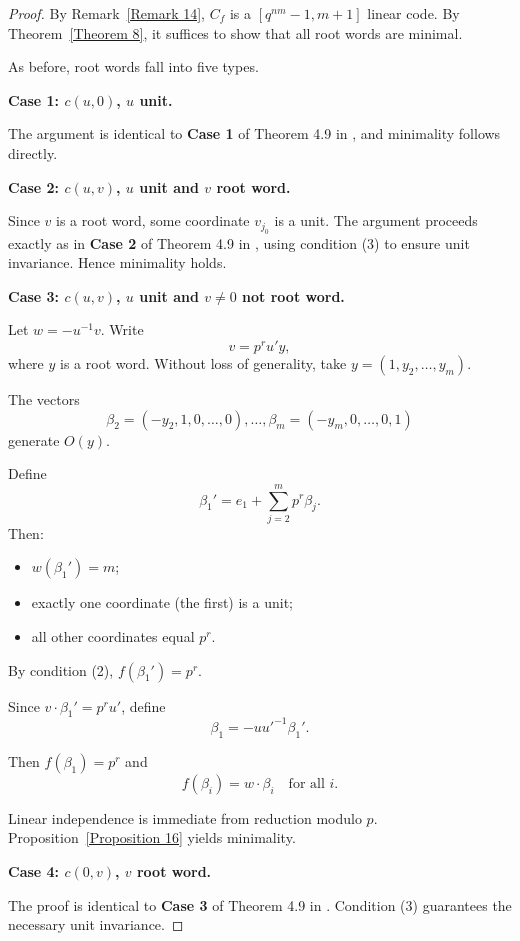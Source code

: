 \documentclass[10pt]{article}
\theoremstyle{definition}
\begin{document}
\begin{proof}

By Remark~\ref{Remark 14},
$C_f$ is a $[q^{nm}-1,m+1]$ linear code.
By Theorem~\ref{Theorem 8},
it suffices to show that all root words are minimal.

As before, root words fall into five types.

\medskip
\noindent
\textbf{Case 1: $c(u,0)$, $u$ unit.}

The argument is identical to
{\bf Case 1} of Theorem 4.9 in \cite{WuLuCao},
and minimality follows directly.

\medskip
\noindent
\textbf{Case 2: $c(u,v)$, $u$ unit and $v$ root word.}

Since $v$ is a root word,
some coordinate $v_{j_0}$ is a unit.
The argument proceeds exactly as in
{\bf Case 2} of Theorem 4.9 in \cite{WuLuCao},
using condition (3) to ensure unit invariance.
Hence minimality holds.

\medskip
\noindent
\textbf{Case 3: $c(u,v)$, $u$ unit and $v\neq 0$ not root word.}

Let $w=-u^{-1}v$.
Write
\[
v=p^r u' y,
\]
where $y$ is a root word.
Without loss of generality,
take $y=(1,y_2,\dots,y_m)$.

The vectors
\[
\beta_2=(-y_2,1,0,\dots,0),\dots,
\beta_m=(-y_m,0,\dots,0,1)
\]
generate $O(y)$.

Define
\[
\beta_1' = e_1 + \sum_{j=2}^m p^r \beta_j.
\]
Then:

\begin{itemize}
\item $w(\beta_1')=m$;
\item exactly one coordinate (the first) is a unit;
\item all other coordinates equal $p^r$.
\end{itemize}

By condition (2), $f(\beta_1')=p^r$.

Since $v\cdot \beta_1'=p^ru'$,
define
\[
\beta_1=-u u'^{-1}\beta_1'.
\]

Then $f(\beta_1)=p^r$ and
\[
f(\beta_i)=w\cdot \beta_i
\quad \text{for all } i.
\]

Linear independence is immediate from reduction modulo $p$.
Proposition~\ref{Proposition 16} yields minimality.

\medskip
\noindent
\textbf{Case 4: $c(0,v)$, $v$ root word.}

The proof is identical to
{\bf Case 3} of Theorem 4.9 in \cite{WuLuCao}.
Condition (3) guarantees the necessary unit invariance.


\end{proof}
\end{document}

